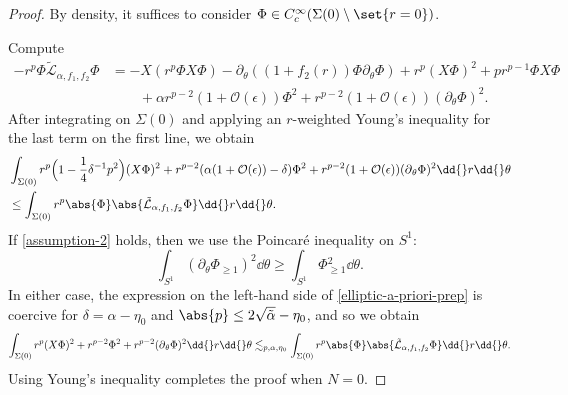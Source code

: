 \documentclass[10pt, reqno]{amsart}
\begin{document}
\begin{proof}
By density, it suffices to consider \(\Phi{}\in C_c^\infty(\Sigma{}(0)\setminus \set{r=0})\).

 Compute
\begin{equation}
\begin{split}
-r^p\Phi{}\tilde{\mathcal{L}}_{\alpha{},f_1,f_2}\Phi{} &= -X(r^p\Phi{}X\Phi{}) - \partial{}_\theta{}((1+f_2(r))\Phi{}\partial{}_\theta{}\Phi{}) + r^p(X\Phi{})^2 + pr^{p-1}\Phi{}X\Phi{} \\
&\qquad + \alpha{}r^{p-2}(1 + \mathcal{O}(\epsilon{}))\Phi^2 + r^{p-2}(1+\mathcal{O}(\epsilon{}))(\partial{}_\theta{}\Phi{})^2.
\end{split}
\end{equation}
After integrating on \(\Sigma{}(0)\) and applying an \(r\)-weighted Young's inequality
for the last term on the first line, we obtain
\begin{equation}\label{elliptic-a-priori-prep}
\begin{split}
&\int _{\Sigma{}(0)} r^p\Bigl(1 - \frac{1}{4}\delta{}^{-1}p^2\Bigr)(X\Phi{})^2 + r^{p-2}(\alpha{}(1+\mathcal{O}(\epsilon{})) - \delta{})\Phi^2 + r^{p-2}(1+\mathcal{O}(\epsilon{}))(\partial{}_\theta{}\Phi{})^2\dd{}r\dd{}\theta{}\\
&\le \int _{\Sigma{}(0)}r^p\abs{\Phi{}}\abs{\tilde{\mathcal{L}}_{\alpha{},f_1,f_2}\Phi{}}\dd{}r\dd{}\theta{}.
\end{split}
\end{equation}
If \cref{assumption-2} holds, then we use the Poincaré inequality on \(S^1\):
\begin{equation}
\int _{S^1} (\partial{}_\theta{}\Phi{}_{\ge 1})^2\dd{}\theta{}\ge \int _{S^1} \Phi{}_{\ge 1}^2 \dd{}\theta{}.
\end{equation}
In either case, the expression on the left-hand side of \cref{elliptic-a-priori-prep} is
coercive for \(\delta{} = \alpha{} - \eta_0\) and \(\abs{p}\le 2\sqrt{\tilde{\alpha{}}} - \eta_0\), and so we obtain
\begin{equation}
\int _{\Sigma{}(0)} r^p(X\Phi{})^2 + r^{p-2}\Phi^2 + r^{p-2}(\partial{}_\theta{}\Phi{})^2\dd{}r\dd{}\theta{}\lesssim _{p,\alpha{},\eta{}_0} \int _{\Sigma{}(0)}r^p\abs{\Phi{}}\abs{\tilde{\mathcal{L}}_{\alpha{},f_1,f_2}\Phi{}}\dd{}r\dd{}\theta{}.
\end{equation}
Using Young's inequality completes the proof when \(N = 0\).


\end{proof}
\end{document}
